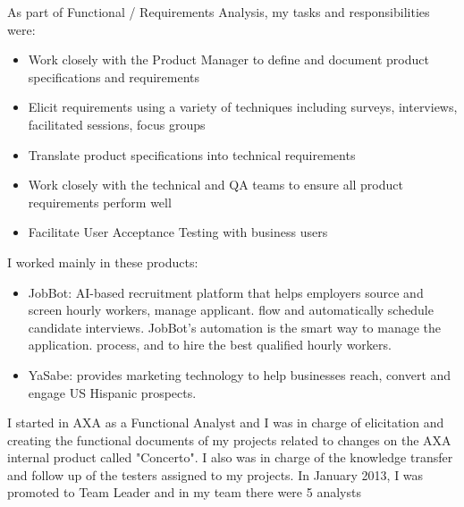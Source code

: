 \documentclass[11pt,a4paper,sans]{moderncv}
\begin{document}
As part of  Functional / Requirements Analysis, my tasks and responsibilities were:
\begin{itemize}
  \item Work closely with the Product Manager to define and document product specifications and requirements
  \item Elicit requirements using a variety of techniques including surveys, interviews, facilitated sessions, focus groups
  \item Translate product specifications into technical requirements
  \item Work closely with the technical and QA teams to ensure all product requirements perform well
  \item Facilitate User Acceptance Testing with business users
\newline
\end{itemize}

I worked mainly in these products:
\begin{itemize}
  \item JobBot: AI-based recruitment platform that helps employers source and screen hourly workers, manage applicant. flow and automatically schedule candidate interviews. JobBot's automation is the smart way to manage the application. process, and to hire the best qualified hourly workers.
  \item YaSabe: provides marketing technology to help businesses reach, convert and engage US Hispanic prospects.
\newline
\newline
\end{itemize}




I started in AXA as a Functional Analyst and I was in charge of elicitation and creating the functional documents of my projects related to changes on the AXA internal product called "Concerto". I also was in charge of the knowledge transfer and follow up of the testers assigned to my projects. In January 2013, I was promoted to Team Leader and in my team there were 5 analysts
\\
\end{document}
